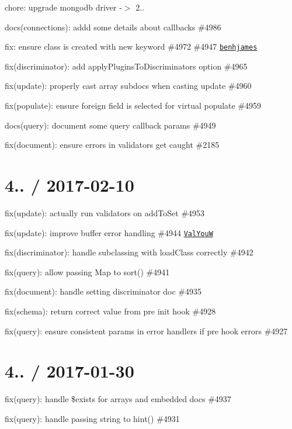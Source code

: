 \begin{DoxyItemize}
\item chore\+: upgrade mongodb driver -\/$>$ 2..
\item docs(connections)\+: addd some details about callbacks \#4986
\item fix\+: ensure class is created with new keyword \#4972 \#4947 \href{https://github.com/benhjames}{\tt benhjames}
\item fix(discriminator)\+: add apply\+Plugins\+To\+Discriminators option \#4965
\item fix(update)\+: properly cast array subdocs when casting update \#4960
\item fix(populate)\+: ensure foreign field is selected for virtual populate \#4959
\item docs(query)\+: document some query callback params \#4949
\item fix(document)\+: ensure errors in validators get caught \#2185
\end{DoxyItemize}

\section*{4.. / 2017-\/02-\/10 }


\begin{DoxyItemize}
\item fix(update)\+: actually run validators on add\+To\+Set \#4953
\item fix(update)\+: improve buffer error handling \#4944 \href{https://github.com/ValYouW}{\tt Val\+YouW}
\item fix(discriminator)\+: handle subclassing with load\+Class correctly \#4942
\item fix(query)\+: allow passing Map to sort() \#4941
\item fix(document)\+: handle setting discriminator doc \#4935
\item fix(schema)\+: return correct value from pre init hook \#4928
\item fix(query)\+: ensure consistent params in error handlers if pre hook errors \#4927
\end{DoxyItemize}

\section*{4.. / 2017-\/01-\/30 }


\begin{DoxyItemize}
\item fix(query)\+: handle \$exists for arrays and embedded docs \#4937
\item fix(query)\+: handle passing string to hint() \#4931
\end{DoxyItemize}

